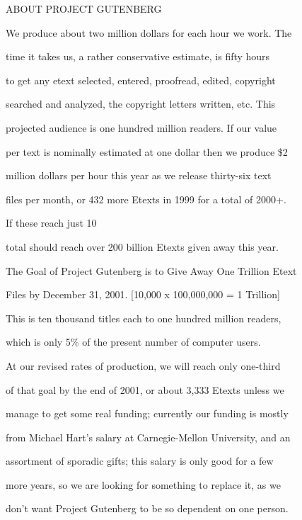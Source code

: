 \documentclass[12pt]{book}
\begin{document}
\newpage



\begin{center}

{\Large ABOUT PROJECT GUTENBERG}

\end{center}



We produce about two million dollars for each hour we work.  The

time it takes us, a rather conservative estimate, is fifty hours

to get any etext selected, entered, proofread, edited, copyright

searched and analyzed, the copyright letters written, etc.  This

projected audience is one hundred million readers.  If our value

per text is nominally estimated at one dollar then we produce \$2

million dollars per hour this year as we release thirty-six text

files per month, or 432 more Etexts in 1999 for a total of 2000+.

If these reach just 10%

total should reach over 200 billion Etexts given away this year.



The Goal of Project Gutenberg is to Give Away One Trillion Etext

Files by December 31, 2001.  [10,000 x 100,000,000 = 1 Trillion]

This is ten thousand titles each to one hundred million readers,

which is only 5\% of the present number of computer users.



At our revised rates of production, we will reach only one-third

of that goal by the end of 2001, or about 3,333 Etexts unless we

manage to get some real funding; currently our funding is mostly

from Michael Hart's salary at Carnegie-Mellon University, and an

assortment of sporadic gifts; this salary is only good for a few

more years, so we are looking for something to replace it, as we

don't want Project Gutenberg to be so dependent on one person.
\end{document}
